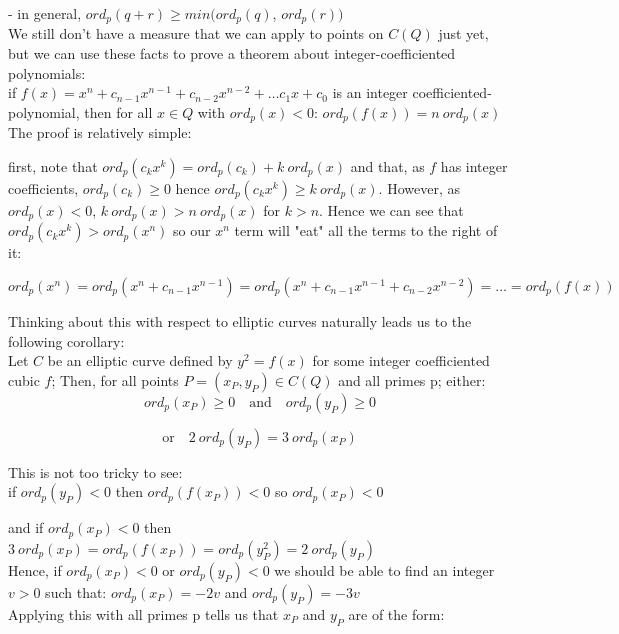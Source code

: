 \documentclass{article}
\begin{document}
- in general, $ord_p(q + r) \geq min(ord_p(q)$, $ord_p(r))$\\

We still don't have a measure that we can apply to points on $C(Q)$ just yet, but we can use these facts to prove a theorem about integer-coefficiented polynomials:\\

if $f(x) = x^n + c_{n-1}x^{n-1} + c_{n-2}x^{n-2} + \dots c_1 x + c_0$ is an integer coefficiented-polynomial, then for all $x \in Q$ with $ord_p(x) < 0$: $ord_p(f(x)) = n \ ord_p(x)$\\

The proof is relatively simple:

first, note that $ord_p(c_k x^k) = ord_p(c_k) + k \ ord_p(x)$ and that, as $f$ has integer coefficients, $ord_p(c_k) \geq 0$ hence $ord_p(c_k x^k) \geq k \ ord_p(x)$. However, as $ord_p(x) < 0$, $k \ ord_p(x) > n \ ord_p(x)$ for $k > n$. Hence we can see that $ord_p(c_k x^k) > ord_p(x^n)$ so our $x^n$ term will "eat" all the terms to the right of it:

\[ ord_p(x^n) = ord_p(x^n + c_{n-1}x^{n-1}) = ord_p(x^n + c_{n-1}x^{n-1} + c_{n-2}x^{n-2}) = \dots = ord_p(f(x)) \]


Thinking about this with respect to elliptic curves naturally leads us to the following corollary:\\

Let $C$ be an elliptic curve defined by $y^2 = f(x)$ for some integer coefficiented cubic $f$; Then, for all points $P = (x_P, y_P) \in C(Q)$ and all primes p; either:\\

\[ ord_p(x_P) \geq 0 \quad \text{and} \quad  ord_p(y_P) \geq 0 \]

\[ \text{or} \quad  2 \ ord_p(y_P) = 3 \ ord_p(x_P) \]

This is not too tricky to see:\\

if \quad $ord_p(y_P) < 0$ \quad then \quad $ord_p(f(x_P)) < 0$ \quad so \quad $ord_p(x_P) < 0$

and if \quad $ord_p(x_P) < 0$ \quad then \quad $3 \ ord_p(x_P) = ord_p(f(x_P)) = ord_p(y_P^2) = 2 \ ord_p(y_P)$\\

Hence, if $ord_p(x_P) < 0$ or $ord_p(y_P) < 0$ we should be able to find an integer $v > 0$ such that: $ord_p(x_P) = -2v$ and $ord_p(y_P) = -3v$\\

Applying this with all primes p tells us that $x_P$ and $y_P$ are of the form:\\
\end{document}

